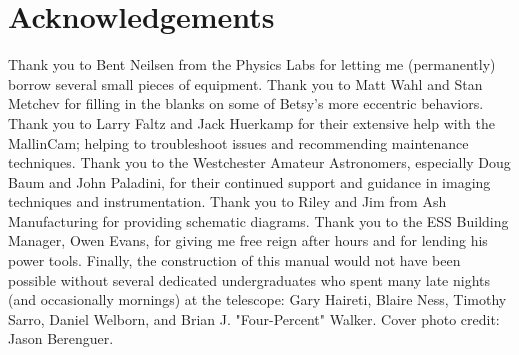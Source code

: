\documentclass[12pt,titlepage]{article}
\begin{document}
\section*{Acknowledgements}

Thank you to Bent Neilsen from the Physics Labs for letting me (permanently) borrow several small pieces of equipment.
Thank you to Matt Wahl and Stan Metchev for filling in the blanks on some of Betsy's more eccentric behaviors.
Thank you to Larry Faltz and Jack Huerkamp for their extensive help with the MallinCam; helping to troubleshoot issues and recommending maintenance techniques.
Thank you to the Westchester Amateur Astronomers, especially Doug Baum and John Paladini, for their continued support and guidance in imaging techniques and instrumentation.
Thank you to Riley and Jim from Ash Manufacturing for providing schematic diagrams.
Thank you to the ESS Building Manager, Owen Evans, for giving me free reign after hours and for lending his power tools.
Finally, the construction of this manual would not have been possible without several dedicated
undergraduates who spent many late nights (and occasionally mornings) at the
telescope: Gary Haireti, Blaire Ness, Timothy Sarro, Daniel Welborn, and
Brian J. "Four-Percent" Walker.
Cover photo credit: Jason Berenguer.		

\clearpage





\end{document}
